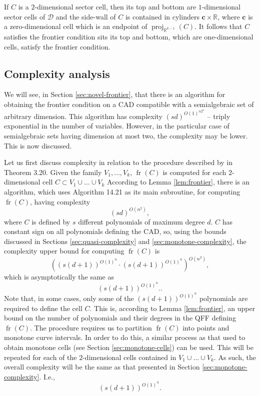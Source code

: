 \documentclass[
]{book}
\theoremstyle{definition}
\theoremstyle{definition}
\theoremstyle{definition}
\theoremstyle{definition}
\theoremstyle{remark}
\begin{document}
If \(C\) is a \(2\)-dimensional sector cell, then its top and bottom are \(1\)-dimensional sector cells of \(\mathcal{D}\) and the side-wall of \(C\) is contained in cylinders \(\mathbf{c} \times \mathbb{R}\), where \(\mathbf{c}\) is a zero-dimensional cell which is an endpoint of \({\operatorname{proj}_{\mathbb{R}^{k-1}}}(C)\). It follows that \(C\) satisfies the frontier condition sits its top and bottom, which are one-dimensional cells, satisfy the frontier condition.

\hypertarget{complexity-analysis}{%
\subsection{Complexity analysis}\label{complexity-analysis}}

We will see, in Section \ref{sec:novel-frontier}, that there is an algorithm for obtaining the frontier condition on a CAD compatible with a semialgebraic set of arbitrary dimension. This algorithm has complexity \((sd)^{O(1)^{n2^n}}\) -- triply exponential in the number of variables. However, in the particular case of semialgebraic sets having dimension at most two, the complexity may be lower. This is now discussed.

Let us first discuss complexity in relation to the procedure described by \citet{bgv15} in Theorem 3.20. Given the family \(V_1,\ldots,V_k\), \({\operatorname{fr} \left( C \right)}\) is computed for each \(2\)-dimensional cell \(C \subset V_1\cup \ldots \cup V_k\) According to Lemma \ref{lem:frontier}, there is an algorithm, which uses \citet{bpr2006} Algorithm 14.21 as its main subroutine, for computing \({\operatorname{fr} \left( C \right)}\), having complexity \[
(sd)^{O(n^2)},
\]
where \(C\) is defined by \(s\) different polynomials of maximum degree \(d\).
\(C\) has constant sign on all polynomials defining the CAD, so, using the bounds discussed in Sections \ref{sec:quasi-complexity} and \ref{sec:monotone-complexity}, the complexity upper bound for computing \({\operatorname{fr} \left( C \right)}\) is
\[
\left(\left(s(d+1)\right)^{O(1)^{n}}\cdot\left(s(d+1)\right)^{O(1)^{n}}\right)^{O(n^2)},
\]
which is asymptotically the same as
\[
(s(d+1))^{O(1)^{n}}..
\]
Note that, in some cases, only some of the \(\left(s(d+1)\right)^{O(1)^{n}}\) polynomials are required to define the cell \(C\).
This is, according to Lemma \ref{lem:frontier}, an upper bound on the number of polynomials and their degrees in the QFF defining \({\operatorname{fr} \left( C \right)}\).
The procedure requires us to partition \({\operatorname{fr} \left( C \right)}\) into points and monotone curve intervals.
In order to do this, a similar process as that used to obtain monotone cells (see Section \ref{sec:monotone-cells}) can be used. This will be repeated for each of the \(2\)-dimensional cells contained in \(V_1\cup \ldots \cup V_k\). As such, the overall complexity will be the same as that presented in Section \ref{sec:monotone-complexity}. I.e.,
\[
(s(d+1))^{O(1)^{n}}.
\]
\end{document}

